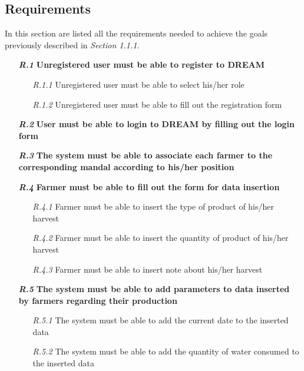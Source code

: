 \newpage
\subsection{Requirements}

In this section are listed all the requirements needed to achieve the goals previously described in \textit{Section 1.1.1}.\\

\begin{itemize}

\item [\textbf{\textit{R.1}}] \textbf{Unregistered user must be able to register to DREAM}
        \begin{itemize}
            \item [\textit{R.1.1}] Unregistered user must be able to select his/her role
            \item [\textit{R.1.2}] Unregistered user must be able to fill out the registration form
        \end{itemize}
        \item [\textbf{\textit{R.2}}] \textbf{User must be able to login to DREAM by filling out the login form}

        \item [\textbf{\textit{R.3}}] \textbf{The system must be able to associate each farmer to the corresponding mandal according to his/her position}
        
            \item [\textbf{\textit{R.4}}] \textbf{Farmer must be able to fill out the form for data insertion}
            \begin{itemize}
                \item [\textit{R.4.1}] Farmer must be able to insert the type of product of his/her harvest
                \item [\textit{R.4.2}] Farmer must be able to insert the quantity of product of his/her harvest
	            \item [\textit{R.4.3}] Farmer must be able to insert note about his/her harvest
            \end{itemize}
            \item [\textbf{\textit{R.5}}] \textbf{The system must be able to add parameters to data inserted by farmers regarding their production}
            \begin{itemize}
                \item [\textit{R.5.1}] The system must be able to add the current date to the inserted data
                \item [\textit{R.5.2}] The system must be able to add the quantity of water consumed to the inserted data
            \end{itemize}


\end{itemize}

